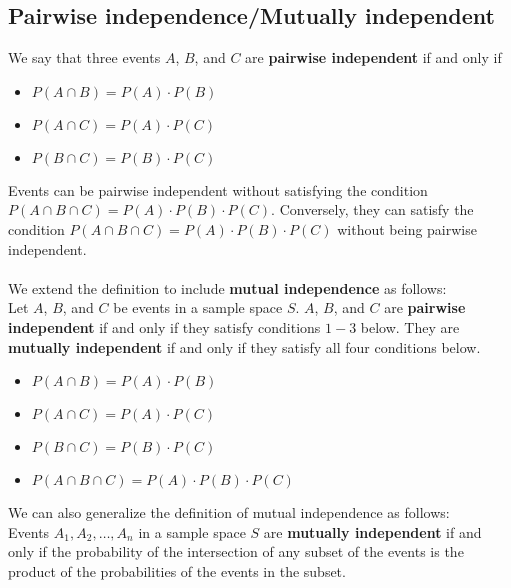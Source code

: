 \documentclass[a4paper]{article}
\begin{document}
\subsection{Pairwise independence/Mutually independent}
We say that three events $A$, $B$, and $C$ are \textbf{pairwise independent} if and only if
\begin{itemize}
	\item[] $P(A\cap B) = P(A) \cdot P(B)$
	\item[] $P(A\cap C) = P(A) \cdot P(C)$
	\item[] $P(B\cap C) = P(B) \cdot P(C)$
\end{itemize}
Events can be pairwise independent without satisfying the condition $P(A\cap B\cap C) = P(A) \cdot P(B) \cdot P(C)$. Conversely, they can satisfy the condition $P(A\cap B\cap C) = P(A) \cdot P(B) \cdot P(C)$ without being pairwise independent.\\\\
We extend the definition to include \textbf{mutual independence} as follows:\\
Let $A$, $B$, and $C$ be events in a sample space $S$. $A$, $B$, and $C$ are \textbf{pairwise independent} if and only if they satisfy conditions $1-3$ below. They are \textbf{mutually independent} if and only if they satisfy all four conditions below.
\begin{itemize}
	\item[] $P(A\cap B) = P(A) \cdot P(B)$
	\item[] $P(A\cap C) = P(A) \cdot P(C)$
	\item[] $P(B\cap C) = P(B) \cdot P(C)$
	\item[] $P(A\cap B\cap C) = P(A) \cdot P(B) \cdot P(C)$
\end{itemize}
We can also generalize the definition of mutual independence as follows:\\
Events $A_1, A_2,\dots,A_n$ in a sample space $S$ are \textbf{mutually independent} if and only if the probability of the intersection of any subset of the events is the product of the probabilities of the events in the subset.
\end{document}
